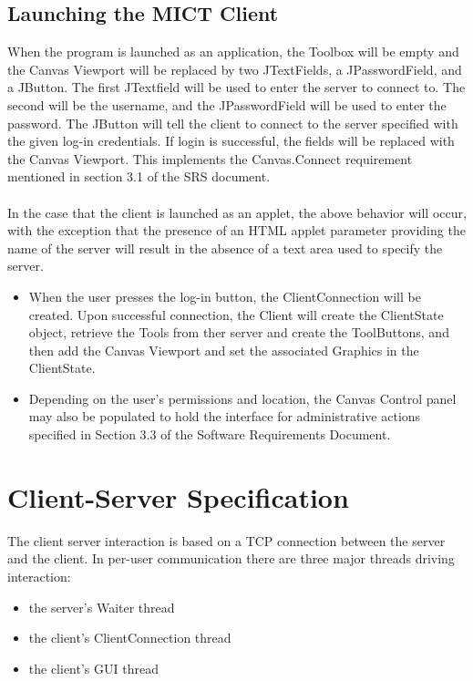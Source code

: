 \documentclass[11pt,oneside,a4paper]{article}
\begin{document}
 \subsection{Launching the MICT Client}
  When the program is launched as an application, the Toolbox will be empty and
  the Canvas Viewport will be replaced by two JTextFields, a JPasswordField, and
  a JButton. The first JTextfield will be used to enter the server to connect to.
  The second will be the username, and the JPasswordField will be used to enter
  the password. The JButton will tell the client to connect to the server
  specified with the given log-in credentials. If login is successful, the fields
  will be replaced with the Canvas Viewport. This implements the Canvas.Connect
  requirement mentioned in section 3.1 of the SRS document.\\\\
  In the case that the client is launched as an applet, the above behavior will
  occur, with the exception that the presence of an HTML applet parameter
  providing the name of the server will result in the absence of a text area used
  to specify the server.
  \begin{itemize}
   \item
    When the user presses the log-in button, the ClientConnection will be
    created. Upon successful connection, the Client will create the ClientState
    object, retrieve the Tools from ther server and create the ToolButtons, and
    then add the Canvas Viewport and set the associated Graphics in the
    ClientState.
   \item
    Depending on the user's permissions and location, the Canvas Control panel
    may also be populated to hold the interface for administrative actions
    specified in Section 3.3 of the Software Requirements Document.
  \end{itemize}

\section{Client-Server Specification}
 The client server interaction is based on a TCP connection between the server and the client.  
 In per-user communication there are three major threads driving interaction:
 \begin{itemize}
  \item the server's Waiter thread
  \item the client's ClientConnection thread
  \item the client's GUI thread
 \end{itemize}
\end{document}
